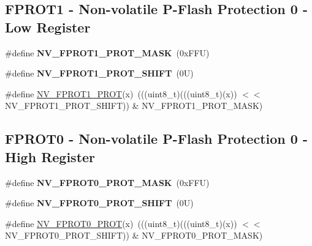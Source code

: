 \subsection*{F\+P\+R\+O\+T1 -\/ Non-\/volatile P-\/\+Flash Protection 0 -\/ Low Register}
\begin{DoxyCompactItemize}
\item 
\mbox{\label{group___n_v___register___masks_ga4ca39bad3b57769cb423f1616c985e38}} 
\#define {\bfseries N\+V\+\_\+\+F\+P\+R\+O\+T1\+\_\+\+P\+R\+O\+T\+\_\+\+M\+A\+SK}~(0x\+F\+F\+U)
\item 
\mbox{\label{group___n_v___register___masks_ga06d0cb2797f243b77d60cfecedfc9f86}} 
\#define {\bfseries N\+V\+\_\+\+F\+P\+R\+O\+T1\+\_\+\+P\+R\+O\+T\+\_\+\+S\+H\+I\+FT}~(0\+U)
\item 
\#define \mbox{\hyperlink{group___n_v___register___masks_ga04b1531f415057befbd26a0bad3bd7e6}{N\+V\+\_\+\+F\+P\+R\+O\+T1\+\_\+\+P\+R\+OT}}(x)~(((uint8\+\_\+t)(((uint8\+\_\+t)(x)) $<$$<$ N\+V\+\_\+\+F\+P\+R\+O\+T1\+\_\+\+P\+R\+O\+T\+\_\+\+S\+H\+I\+FT)) \& N\+V\+\_\+\+F\+P\+R\+O\+T1\+\_\+\+P\+R\+O\+T\+\_\+\+M\+A\+SK)
\end{DoxyCompactItemize}
\subsection*{F\+P\+R\+O\+T0 -\/ Non-\/volatile P-\/\+Flash Protection 0 -\/ High Register}
\begin{DoxyCompactItemize}
\item 
\mbox{\label{group___n_v___register___masks_gafb9244a297e4e856c53e7cb9515d8549}} 
\#define {\bfseries N\+V\+\_\+\+F\+P\+R\+O\+T0\+\_\+\+P\+R\+O\+T\+\_\+\+M\+A\+SK}~(0x\+F\+F\+U)
\item 
\mbox{\label{group___n_v___register___masks_gaaae2badd9a03af803a09537c6c89382a}} 
\#define {\bfseries N\+V\+\_\+\+F\+P\+R\+O\+T0\+\_\+\+P\+R\+O\+T\+\_\+\+S\+H\+I\+FT}~(0\+U)
\item 
\#define \mbox{\hyperlink{group___n_v___register___masks_ga69a376822e2425a5933dc10569a42d3d}{N\+V\+\_\+\+F\+P\+R\+O\+T0\+\_\+\+P\+R\+OT}}(x)~(((uint8\+\_\+t)(((uint8\+\_\+t)(x)) $<$$<$ N\+V\+\_\+\+F\+P\+R\+O\+T0\+\_\+\+P\+R\+O\+T\+\_\+\+S\+H\+I\+FT)) \& N\+V\+\_\+\+F\+P\+R\+O\+T0\+\_\+\+P\+R\+O\+T\+\_\+\+M\+A\+SK)
\end{DoxyCompactItemize}
